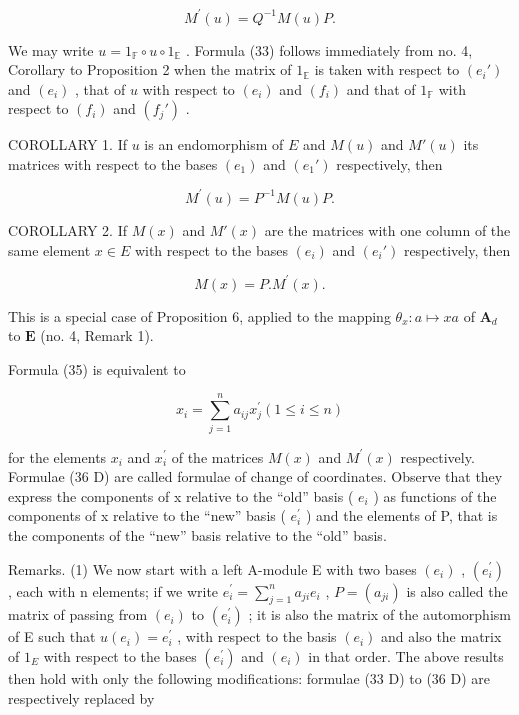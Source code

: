 \[
M ^ {\prime} (u) = Q ^ {- 1} M (u) P.\tag{33 D}
\]

We may write \(u = 1_{\mathbb{F}} \circ u \circ 1_{\mathbb{E}}\) . Formula (33) follows immediately from no. 4, Corollary to Proposition 2 when the matrix of \(1_{\mathbb{E}}\) is taken with respect to \((e_i')\) and \((e_i)\) , that of \(u\) with respect to \((e_i)\) and \((f_i)\) and that of \(1_{\mathbb{F}}\) with respect to \((f_i)\) and \((f_j')\) .

COROLLARY 1. If \(u\) is an endomorphism of \(E\) and \(M(u)\) and \(M'(u)\) its matrices with respect to the bases \((e_1)\) and \((e_1')\) respectively, then

\[
M ^ {\prime} (u) = P ^ {- 1} M (u) P.\tag{34 D}
\]

COROLLARY 2. If \(M(x)\) and \(M'(x)\) are the matrices with one column of the same element \(x \in E\) with respect to the bases \((e_i)\) and \((e_i')\) respectively, then

\[
M (x) = P. M ^ {\prime} (x).\tag{35 D}
\]

This is a special case of Proposition 6, applied to the mapping \(\theta_{x}:a\mapsto xa\) of \(\mathbf{A}_d\) to \(\mathbf{E}\) (no. 4, Remark 1).

Formula (35) is equivalent to

\[
x _ {i} = \sum_ {j = 1} ^ {n} a _ {i j} x _ {j} ^ {\prime} (1 \leqslant i \leqslant n)\tag{36 D}
\]

for the elements \(x_{i}\) and \(x_{i}^{\prime}\) of the matrices \(M(x)\) and \(M^{\prime}(x)\) respectively. Formulae (36 D) are called formulae of change of coordinates. Observe that they express the components of x relative to the ``old'' basis ( \(e_{i}\) ) as functions of the components of x relative to the ``new'' basis ( \(e_{i}^{\prime}\) ) and the elements of P, that is the components of the ``new'' basis relative to the ``old'' basis.

Remarks. (1) We now start with a left A-module E with two bases \((e_{i})\) , \((e_{i}^{\prime})\) , each with n elements; if we write \(e_{i}^{\prime} = \sum_{j=1}^{n} a_{ji} e_{i}\) , \(P = (a_{ji})\) is also called the matrix of passing from \((e_{i})\) to \((e_{i}^{\prime})\) ; it is also the matrix of the automorphism of E such that \(u(e_{i}) = e_{i}^{\prime}\) , with respect to the basis \((e_{i})\) and also the matrix of \(1_{E}\) with respect to the bases \((e_{i}^{\prime})\) and \((e_{i})\) in that order. The above results then hold with only the following modifications: formulae (33 D) to (36 D) are respectively replaced by

